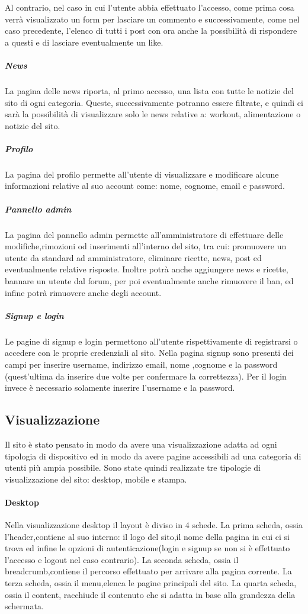 Al contrario, nel caso in cui l'utente abbia effettuato l'accesso, come prima cosa verrà visualizzato un form per lasciare un commento e successivamente, come nel caso precedente, l'elenco di tutti i post con ora anche la possibilità di rispondere a questi e di lasciare eventualmente un like.
\subparagraph{News}
La pagina delle news riporta, al primo accesso, una lista con tutte le notizie del sito di ogni categoria. Queste, successivamente potranno essere filtrate, e quindi ci sarà la possibilità di visualizzare solo le news relative a: workout, alimentazione o notizie del sito.
\subparagraph{Profilo}
La pagina del profilo permette all'utente di visualizzare e modificare alcune informazioni relative al suo account come: nome, cognome, email e password.
\subparagraph{Pannello admin}
La pagina del pannello admin permette all'amministratore di effettuare delle modifiche,rimozioni od inserimenti all'interno del sito, tra cui: promuovere un utente da standard ad amministratore, eliminare ricette, news, post ed eventualmente relative risposte.
Inoltre potrà anche aggiungere news e ricette, bannare un utente dal forum, per poi eventualmente anche rimuovere il ban, ed infine potrà rimuovere anche degli account.
\subparagraph{Signup e login}
Le pagine di signup e login permettono all'utente rispettivamente di  registrarsi o accedere con le proprie credenziali al sito. Nella pagina signup sono presenti dei campi per inserire username, indirizzo email, nome ,cognome e la password (quest’ultima da inserire due volte per confermare la correttezza). Per il login invece è necessario solamente inserire l'username e la password.
\subsection{Visualizzazione}
Il sito è stato pensato in modo da avere una visualizzazione adatta ad ogni tipologia di dispositivo ed in modo da avere pagine accessibili ad una categoria di utenti più ampia possibile.
Sono state quindi realizzate tre tipologie di visualizzazione del sito: desktop, mobile e stampa.
\paragraph{Desktop}
Nella visualizzazione desktop il layout è diviso in 4 schede.
La prima scheda, ossia l'header,contiene al suo interno: il logo del sito,il nome della pagina in cui ci si trova ed infine le opzioni di autenticazione(login e signup se non si è effettuato l'accesso e logout nel caso contrario).
La seconda scheda, ossia il breadcrumb,contiene il percorso effettuato per arrivare alla pagina corrente.
La terza scheda, ossia il menu,elenca le pagine principali del sito.
La quarta scheda, ossia il content, racchiude il contenuto che si adatta in base alla grandezza della schermata.
